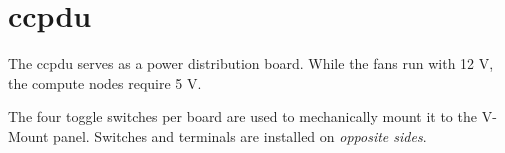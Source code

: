 





\section{ccpdu}

The ccpdu serves as a power distribution board.
While the fans run with 12 V, the compute nodes require 5 V.

The four toggle switches per board are used to mechanically mount it to the V-Mount panel.
Switches and terminals are installed on \emph{opposite sides}.






